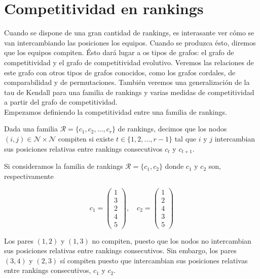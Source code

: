 \chapter{Competitividad en rankings}

Cuando se dispone de una gran cantidad de rankings, es interasante ver cómo se van intercambiando las posiciones los equipos. Cuando se produzca ésto, diremos que los equipos compiten. Ésto dará lugar a os tipos de grafos: el grafo de competitividad y el grafo de competitividad evolutivo. Veremos las relaciones de este grafo con otros tipos de grafos conocidos, como los grafos cordales, de comparabilidad y de permutaciones. También veremos una generalización de la tau de Kendall para una familia de rankings y varias medidas de competitividad a partir del grafo de competitividad.\\

Empezamos definiendo la competitividad entre una familia de rankings.

\begin{defi}
Dada una familia $\mathcal{R} = \{c_1, c_2, \dots, c_r\}$ de rankings, decimos que los nodos $(i,j) \in \mathcal{N} \times \mathcal{N}$ compiten si existe $t \in \{1,2,\dots, r-1\}$ tal que $i$ y $j$ intercambian sus posiciones relativas entre rankings consecutivos $c_t$ y $c_{t+1}$.
\end{defi}

\begin{ejemplo}
Si consideramos la familia de rankings $\mathcal{R} = \{c_1, c_2\}$ donde $c_1$ y $c_2$ son, respectivamente

\begin{equation*}
c_1 = \left( \begin{array}{c}
1\\
3\\
2\\
4\\
5
\end{array} \right), \quad
c_2 = \left( \begin{array}{c}
1\\
2\\
4\\
3\\
5
\end{array} \right)
\end{equation*}

Los pares $(1,2)$ y $(1,3)$ no compiten, puesto que los nodos no intercambian sus posiciones relativas entre rankings consecutivos. Sin embargo, los pares $(3,4)$ y $(2,3)$ sí compiten puesto que intercambian sus posiciones relativas entre rankings consecutivos, $c_1$ y $c_2$.
\end{ejemplo}

